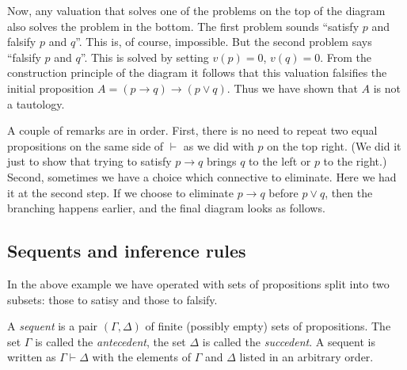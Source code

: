 \begin{page}
Now, any valuation that solves one of the problems on the top of the diagram also solves the problem in the bottom.
The first problem sounds ``satisfy $p$ and falsify $p$ and $q$''.
This is, of course, impossible.
But the second problem says ``falsify $p$ and $q$''.
This is solved by setting $v(p) = 0$, $v(q) = 0$.
From the construction principle of the diagram it follows that this valuation falsifies the initial proposition $A = (p \to q) \to (p \vee q)$.
Thus we have shown that $A$ is not a tautology.

A couple of remarks are in order.
First, there is no need to repeat two equal propositions on the same side of $\vdash$ as we did with $p$ on the top right.
(We did it just to show that trying to satisfy $p \to q$ brings $q$ to the left or $p$ to the right.)
Second, sometimes we have a choice which connective to eliminate.
Here we had it at the second step.
If we choose to eliminate $p \to q$ before $p \vee q$, then the branching happens earlier, and the final diagram looks as follows.
\begin{prooftree}
\end{prooftree}




\end{page}

\begin{page}
\setcounter{section}{2}
\setcounter{subsection}{4}
\setcounter{dfn}{5}
\label{portion:433}

\subsection{Sequents and inference rules}
In the above example we have operated with sets of propositions split into two subsets: those to satisy and those to falsify.

\end{page}

\begin{page}
\setcounter{section}{2}
\setcounter{subsection}{4}
\setcounter{dfn}{6}
\label{portion:435}

\begin{dfn}
A \emph{sequent} is a pair $(\Gamma, \Delta)$ of finite (possibly empty) sets of propositions.
The set $\Gamma$ is called the \emph{antecedent}, the set $\Delta$ is called the \emph{succedent}.
A sequent is written as $\Gamma \vdash \Delta$ with the elements of $\Gamma$ and $\Delta$ listed in an arbitrary order.
\end{dfn}

\end{page}


